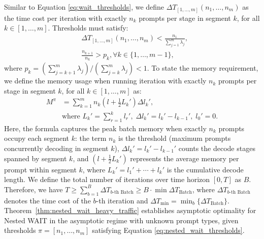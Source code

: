 Similar to Equation \eqref{eq:wait_thresholds}, we define \( \Delta T_{[1,\dots,m]}(n_1, \dots, n_m) \) as the time cost per iteration with exactly \( n_k \) prompts per stage in segment \( k \), for all \( k \in [1, \dots, m] \). Thresholds must satisfy:
\begin{equation}
    \label{eq:nested_wait_thresholds}
    \begin{aligned}
    &\Delta T_{[1,\dots,m]}(n_1, \dots, n_m) <\frac{n_1}{\sum_{j=1}^m \lambda_j}, \\
    &\frac{n_{k+1}}{n_k} > p_k,\forall k \in \{1, \dots, m-1\},
    \end{aligned}
\end{equation}
where $p_k = (\sum_{j=k+1}^m\lambda_j)/(\sum_{j=k}^m\lambda_j)<1.$ To state the memory requirement, we define the memory usage when running iteration with exactly \( n_k \) prompts per stage in segment \( k \), for all \( k \in [1, \dots, m] \) as:
\begin{equation}
    \label{eq:nested_wait_memory}
\begin{aligned}
        M^\pi &= \sum_{k=1}^m n_k \left(l + \tfrac{1}{2}L_k'\right) \Delta l_k', \\
    &\text{where } L_k' = \sum_{r=1}^k l_r',\; \Delta l_k' = l_k' - l_{k-1}',\; l_0' = 0.
\end{aligned}
\end{equation}
Here, the formula captures the peak batch memory when exactly $n_k$ prompts occupy each segment $k$: the term $n_k$ is the threshold (maximum prompts concurrently decoding in segment $k$), $\Delta l_k' = l_k' - l_{k-1}'$ counts the decode stages spanned by segment $k$, and $(l + \tfrac{1}{2}L_k')$ represents the average memory per prompt within segment $k$, where $L_k' = l_1' + \cdots + l_k'$ is the cumulative decode length.
We define the total number of iterations over time horizon $[0,T]$ as $B$. Therefore, we have $T\ge\sum_{b=1}^B \Delta T_{b\text{-th Batch}}\geq B\cdot \min \Delta T_{\text{Batch}}$, where $\Delta T_{b\text{-th Batch}}$ denotes the time cost of the $b$-th iteration and $\Delta T_{\min}=\min_b\{\Delta T_{\text{Batch}}\}$.
Theorem~\ref{thm:nested_wait_heavy_traffic} establishes asymptotic optimality for Nested WAIT in the asymptotic regime with unknown prompt types, given thresholds \( \pi = [n_1, \dots, n_m] \) satisfying Equation \eqref{eq:nested_wait_thresholds}.

